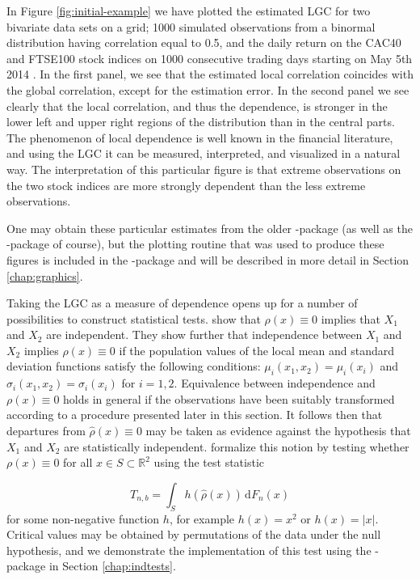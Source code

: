 In Figure \ref{fig:initial-example} we have plotted the estimated LGC for two bivariate data sets on a grid; 1000 simulated observations from a binormal distribution having correlation equal to 0.5, and the daily return on the CAC40 and FTSE100 stock indices on 1000 consecutive trading days starting on May 5th 2014 \citep{datastream}. In the first panel, we see that the estimated local correlation coincides with the global correlation, except for the estimation error. In the second panel we see clearly that the local correlation, and thus the dependence, is stronger in the lower left and upper right regions of the distribution than in the central parts. The phenomenon of local dependence is well known in the financial literature, and using the LGC it can be measured, interpreted, and visualized in a natural way. The interpretation of this particular figure is that extreme observations on the two stock indices are more strongly dependent than the less extreme observations. 

One may obtain these particular estimates from the older -package (as well as the -package of course), but the plotting routine that was used to produce these figures is included in the -package and will be described in more detail in Section \ref{chap:graphics}.

Taking the LGC as a measure of dependence opens up for a number of possibilities to construct statistical tests. \citet{bere:tjos:2014} show that $\rho(x) \equiv 0$ implies that $X_1$ and $X_2$ are independent. They show further that independence between $X_1$ and $X_2$ implies $\rho(x) \equiv 0$ if the population values of the local mean and standard deviation functions satisfy the following conditions: $\mu_i(x_1, x_2) = \mu_i(x_i)$ and $\sigma_i(x_1, x_2) = \sigma_i(x_i)$ for $i=1,2$. Equivalence between independence and $\rho(x) \equiv 0$ holds in general if the observations have been suitably transformed according to a procedure presented later in this section. It follows then that departures from $\widehat\rho(x) \equiv 0$ may be taken as evidence against the hypothesis that $X_1$ and $X_2$ are statistically independent. \citet{bere:tjos:2014} formalize this notion by testing whether $\rho(x) \equiv 0$ for all $x\in S \subset \mathbb{R}^2$ using the test statistic

\begin{equation}
T_{n,b} = \int_S h\left(\widehat \rho(x) \right) \,\textrm{d}F_n(x)
\label{eq:test-statistic1}
\end{equation}
for some non-negative function $h$, for example $h(x) = x^2$ or $h(x) = |x|$. Critical values may be obtained by permutations of the data under the null hypothesis, and we demonstrate the implementation of this test using the -package in Section \ref{chap:indtests}.

